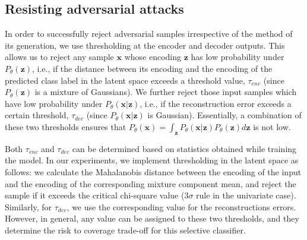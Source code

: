 \documentclass[letterpaper]{article} %
\begin{document}


\subsection{Resisting adversarial attacks}
\label{res_adv_smpls}
In order to successfully reject adversarial samples irrespective of the method of its generation, we use thresholding at the encoder and decoder outputs. This allows us to reject any sample $\mathbf{x}$ whose encoding $\mathbf{z}$ has low probability under $P_\theta(\mathbf{z})$, i.e., if the distance between its encoding and the encoding of the predicted class label in the latent space exceeds a threshold value, $\tau_{enc}$ (since $P_\theta(\mathbf{z})$ is a mixture of Gaussians). We further reject those input samples which have low probability under $P_\theta(\mathbf{x}|\mathbf{z})$, i.e., if the reconstruction error exceeds a certain threshold, $\tau_{dec}$ (since $P_\theta(\mathbf{x}|\mathbf{z})$ is Gaussian). Essentially, a combination of these two thresholds ensures that $P_\theta(\mathbf{x}) = \int_\mathbf{z}P_\theta(\mathbf{x}|\mathbf{z})P_\theta(\mathbf{z})d\mathbf{z}$ is not low. 

Both $\tau_{enc}$ and $\tau_{dec}$ can be determined based on statistics obtained while training the model. In our experiments, we implement thresholding in the latent space as follows: we calculate the Mahalanobis distance between the encoding of the input and the encoding of the corresponding mixture component mean, and reject the sample if it exceeds the critical chi-square value ($3\sigma$ rule in the univariate case). Similarly, for $\tau_{dec}$, we use the corresponding value for the reconstructions errors.
However, in general, any value can be assigned to these two thresholds, and they determine the risk to coverage trade-off for this selective classifier.

\end{document}
